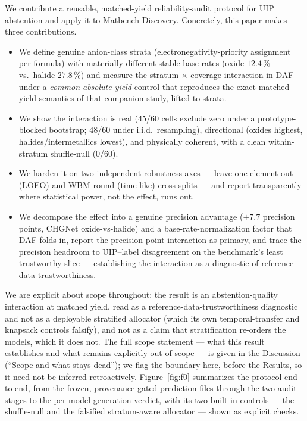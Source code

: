 \documentclass[11pt]{article}
\begin{document}
We contribute a reusable, matched-yield reliability-audit protocol for UIP abstention and apply
it to Matbench Discovery. Concretely, this paper makes three contributions.
\begin{itemize}
  \item We define genuine anion-class strata (electronegativity-priority assignment per
        formula) with materially different stable base rates (oxide $12.4\,\%$ vs.\ halide
        $27.8\,\%$) and measure the stratum $\times$ coverage interaction in DAF under a
        \emph{common-absolute-yield} control that reproduces the exact matched-yield semantics
        of that companion study, lifted to strata.
  \item We show the interaction is real (45/60 cells exclude zero under a prototype-blocked
        bootstrap; 48/60 under i.i.d.\ resampling), directional (oxides highest,
        halides/intermetallics lowest), and physically coherent, with a clean within-stratum
        shuffle-null (0/60).
  \item We harden it on two independent robustness axes --- leave-one-element-out (LOEO)
        and WBM-round (time-like) cross-splits --- and report transparently where statistical
        power, not the effect, runs out.
  \item We decompose the effect into a genuine precision advantage ($+7.7$ precision points,
        CHGNet oxide-vs-halide) and a base-rate-normalization factor that DAF folds in, report
        the precision-point interaction as primary, and trace the precision headroom to
        UIP--label disagreement on the benchmark's least trustworthy slice --- establishing the
        interaction as a diagnostic of reference-data trustworthiness.
\end{itemize}
We are explicit about scope throughout: the result is an abstention-quality
interaction at matched yield, read as a reference-data-trustworthiness diagnostic and not as a
deployable stratified allocator (which its own temporal-transfer and knapsack controls falsify),
and not as a claim that stratification re-orders the models, which it does not. The full scope
statement --- what this result establishes and what remains explicitly out of scope --- is given
in the Discussion (``Scope and what stays dead''); we flag the boundary here, before the Results,
so it need not be inferred retroactively. Figure~\ref{fig:f0} summarizes the protocol end to end, from the frozen,
provenance-gated prediction files through the two audit stages to the per-model-generation
verdict, with its two built-in controls --- the shuffle-null and the falsified stratum-aware
allocator --- shown as explicit checks.
\end{document}
